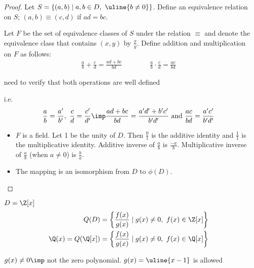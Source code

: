 \documentclass[a4paper]{article}
\begin{document}
\begin{proof}
  Let \( S = \{(a,b) \mid a,b\in D,\ \uline{b\neq 0}\} \). Define an equivalence relation on \( S \); \( (a,b) \equiv (c,d) \) if \( ad = bc \).

  Let \( F \) be the set of equivalence classes of \( S \) under the relation \( \equiv \) and denote the equivalence class that contains \( (x,y) \) by \( \frac{x}{y} \). Define addition and multiplication on \( F \) as follows:
  \begin{align*}
    \frac{a}{b} + \frac{c}{d} = \frac{ad+bc}{bd} \qquad\qquad \frac{a}{b} \cdot \frac{c}{d} = \frac{ac}{bd}
  \end{align*}
  \begin{exercise}
    need to verify that both operations are well defined
  \end{exercise}
  i.e. \begin{align*}
    \frac{a}{b}=\frac{a'}{b'},\ \frac{c}{d} = \frac{c'}{d'} \imp \frac{ad+bc}{bd} = \frac{a'd'+b'c'}{b'd'} \text{ and } \frac{ac}{bd}=\frac{a'c'}{b'd'}
  \end{align*}
  \begin{itemize}
    \item \( F \) is a field. Let 1 be the unity of \( D \). Then \( \frac{0}{1} \) is the additive identity and \( \frac{1}{1} \) is the multiplicative identity. Additive inverse of \( \frac{a}{b} \) is \( \frac{-a}{b} \). Multiplicative inverse of \( \frac{a}{b} \) (when \( a\neq 0 \)) is \( \frac{b}{a} \).
    \item The mapping  is an isomorphism from \( D \) to \( \phi(D) \).
  \end{itemize}
\end{proof}

\begin{example}
  \( D=\Z[x] \)
\begin{align*}
  Q(D) &= \left\{\frac{f(x)}{g(x)}\mid g(x)\neq 0,\ f(x)\in\Z[x]\right\} \\
  \Q(x) = Q(\Q[x]) &= \left\{\frac{f(x)}{g(x)}\mid g(x)\neq 0,\ f(x)\in\Q[x]\right\}
\end{align*}
\begin{note}
  \( g(x)\neq 0 \imp \) not the zero polynomial. \( g(x) = \uline{x-1} \) is allowed
\end{note}
\end{example}
\end{document}

